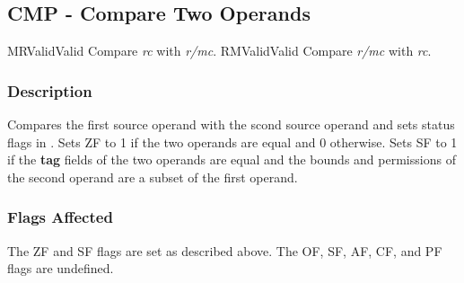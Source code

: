 \clearpage
{}
{}
\subsection*{CMP - Compare Two Operands}

\begin{x86opcodetable}
  {MR}{Valid}{Valid}
  {Compare \emph{rc} with \emph{r/mc}.}
  {RM}{Valid}{Valid}
  {Compare \emph{r/mc} with \emph{rc}.}
\end{x86opcodetable}

\begin{x86opentable}
\end{x86opentable}

\subsubsection*{Description}

Compares the first source operand with the scond source operand and
sets status flags in \RFLAGS{}.  Sets ZF to 1 if the two operands are
equal and 0 otherwise.  Sets SF to 1 if the \textbf{tag} fields of the
two operands are equal and the bounds and permissions of the second
operand are a subset of the first operand.

\subsubsection*{Flags Affected}

The ZF and SF flags are set as described above.  The OF, SF, AF, CF,
and PF flags are undefined.
